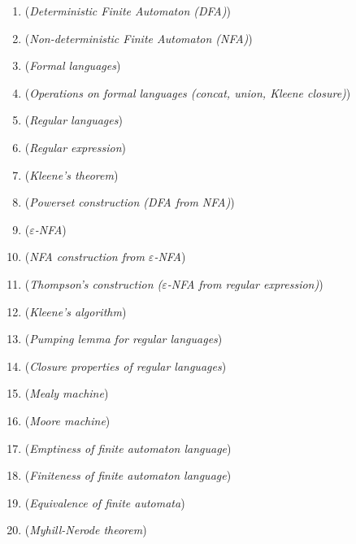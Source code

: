 \documentclass[12pt]{article}
\begin{document}
    \begin{enumerate}
        \item \textbf{} (\textit{Deterministic Finite Automaton (DFA)})

        \item \textbf{} (\textit{Non-deterministic Finite Automaton (NFA)})

        \item \textbf{} (\textit{Formal languages})

        \item \textbf{} (\textit{Operations on formal languages (concat, union, Kleene closure)})

        \item \textbf{} (\textit{Regular languages})

        \item \textbf{} (\textit{Regular expression})

        \item \textbf{} (\textit{Kleene's theorem})

        \item \textbf{} (\textit{Powerset construction (DFA from NFA)})

        \item \textbf{} (\textit{$\varepsilon$-NFA})

        \item \textbf{} (\textit{NFA construction from $\varepsilon$-NFA})

        \item \textbf{} (\textit{Thompson’s construction ($\varepsilon$-NFA from regular expression)})

        \item \textbf{} (\textit{Kleene’s algorithm})

        \item \textbf{} (\textit{Pumping lemma for regular languages})

        \item \textbf{} (\textit{Closure properties of regular languages})

        \item \textbf{} (\textit{Mealy machine})

        \item \textbf{} (\textit{Moore machine})

        \item \textbf{} (\textit{Emptiness of finite automaton language})

        \item \textbf{} (\textit{Finiteness of finite automaton language})

        \item \textbf{} (\textit{Equivalence of finite automata})

        \item \textbf{} (\textit{Myhill-Nerode theorem})

    \end{enumerate}
\end{document}
